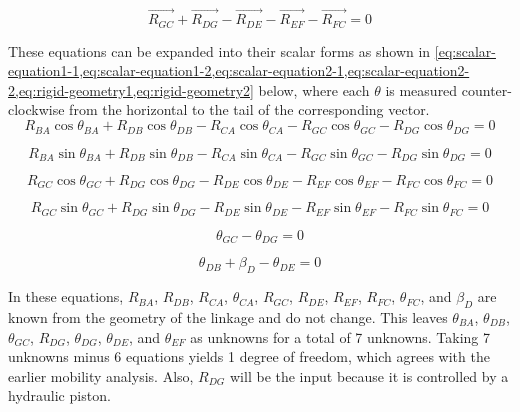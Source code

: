 \documentclass[hidelinks]{article}
\begin{document}
    \begin{equation}
        \label{eq:vector-equation2}
        \vec{R_{GC}}+\vec{R_{DG}}-\vec{R_{DE}}-\vec{R_{EF}}-\vec{R_{FC}}=0
    \end{equation}

    These equations can be expanded into their scalar forms as shown in \cref{eq:scalar-equation1-1,eq:scalar-equation1-2,eq:scalar-equation2-1,eq:scalar-equation2-2,eq:rigid-geometry1,eq:rigid-geometry2} below, where each \(\theta\) is measured counter-clockwise from the horizontal to the tail of the corresponding vector. 
    \begin{equation}
        \label{eq:scalar-equation1-1}
        R_{BA}\cos\theta_{BA}+R_{DB}\cos\theta_{DB}-R_{CA}\cos\theta_{CA}-R_{GC}\cos\theta_{GC}-R_{DG}\cos\theta_{DG}=0
    \end{equation}

    \begin{equation}
        \label{eq:scalar-equation1-2}
        R_{BA}\sin\theta_{BA}+R_{DB}\sin\theta_{DB}-R_{CA}\sin\theta_{CA}-R_{GC}\sin\theta_{GC}-R_{DG}\sin\theta_{DG}=0
    \end{equation}

    \begin{equation}
        \label{eq:scalar-equation2-1}
        R_{GC}\cos\theta_{GC}+R_{DG}\cos\theta_{DG}-R_{DE}\cos\theta_{DE}-R_{EF}\cos\theta_{EF}-R_{FC}\cos\theta_{FC}=0
    \end{equation}

    \begin{equation}
        \label{eq:scalar-equation2-2}
        R_{GC}\sin\theta_{GC}+R_{DG}\sin\theta_{DG}-R_{DE}\sin\theta_{DE}-R_{EF}\sin\theta_{EF}-R_{FC}\sin\theta_{FC}=0
    \end{equation}

    \begin{equation}
        \label{eq:rigid-geometry1}
        \theta_{GC}-\theta_{DG}=0
    \end{equation}

    \begin{equation}
        \label{eq:rigid-geometry2}
        \theta_{DB}+\beta_D-\theta_{DE}=0
    \end{equation}
    
    In these equations, \(R_{BA}\), \(R_{DB}\), \(R_{CA}\), \(\theta_{CA}\), \(R_{GC}\), \(R_{DE}\), \(R_{EF}\), \(R_{FC}\), \(\theta_{FC}\), and \(\beta_D\) are known from the geometry of the linkage and do not change. This leaves \(\theta_{BA}\), \(\theta_{DB}\), \(\theta_{GC}\), \(R_{DG}\), \(\theta_{DG}\), \(\theta_{DE}\), and \(\theta_{EF}\) as unknowns for a total of 7 unknowns. Taking 7 unknowns minus 6 equations yields 1 degree of freedom, which agrees with the earlier mobility analysis. Also, \(R_{DG}\) will be the input because it is controlled by a hydraulic piston.
    
\end{document}
